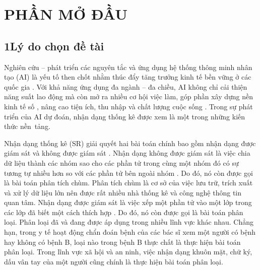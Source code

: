 \documentclass[a4paper,oneside]{book} %
\theoremstyle{plain}
\theoremstyle{plain}
\theoremstyle{nonumberplain}
\begin{document}
	\clearpage

\chapter*{PHẦN MỞ ĐẦU}\label{chapter_intro}
%



\section*{1\quad Lý do chọn đề tài}

 Nghiên cứu -- phát triển các nguyên tắc và ứng dụng hệ thống thông minh nhân tạo (AI) là yếu tố then chốt nhằm thúc đẩy tăng trưởng kinh tế bền vững ở các quốc gia \cite{belhadi2024artificial,act2023artificial}. Với khả năng ứng dụng đa ngành -- đa chiều, AI không chỉ cải thiện năng suất lao động mà còn mở ra nhiều cơ hội việc làm, góp phần xây dựng nền kinh tế số \cite{mollema2024ai}, nâng cao tiện ích, thu nhập và chất lượng cuộc sống \cite{dey2024artificial}. Trong sự phát triển của AI dự đoán, nhận dạng thống kê được xem là một trong những kiến thức nền~tảng.


Nhận dạng thống kê (SR) giải quyết hai bài toán chính bao gồm nhận dạng được giám sát và không được giám sát \cite{Bishop:DeepLearning24,theodoridis2006pattern}. Nhận dạng không được giám sát  là việc chia dữ liệu thành các nhóm sao cho các phần tử trong cùng một nhóm đó có sự tương tự nhiều hơn so với các phần tử bên ngoài nhóm \cite{bezdek1984fcm,macqueen1967some}. Do đó, nó còn được gọi là bài toán phân tích chùm. Phân tích chùm là cơ sở của việc lưu trữ, trích xuất và xử lý dữ liệu lớn nên được rất nhiều nhà thống kê và công nghệ thông tin quan tâm.  Nhận dạng được giám sát là việc xếp một phần tử vào một lớp trong các lớp đã biết một cách thích hợp \cite{Bishop:DeepLearning24,webb2003statistical}. Do đó, nó còn được gọi là bài toán phân loại. Phân loại đã và đang được áp dụng trong nhiều lĩnh vực khác nhau. Chẳng hạn, trong y tế hoạt động chẩn đoán bệnh của các bác sĩ xem một người có bệnh hay không có bệnh B, loại nào trong bệnh B thực chất là thực hiện bài toán phân loại. Trong lĩnh vực xã hội và an ninh, việc nhận dạng khuôn mặt, chữ ký, dấu vân tay của một người cũng chính là thực hiện bài toán phân loại.
\end{document}
